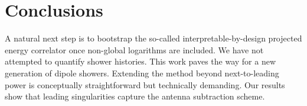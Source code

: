 \section{Conclusions}\label{sec:conclusions}

A natural next step is to bootstrap the so-called
interpretable-by-design projected energy correlator once non-global
logarithms are included. We have not attempted to quantify shower
histories. This work paves the way for a new generation of dipole
showers. Extending the method beyond next-to-leading power is
conceptually straightforward but technically demanding. Our results show
that leading singularities capture the antenna subtraction scheme.

